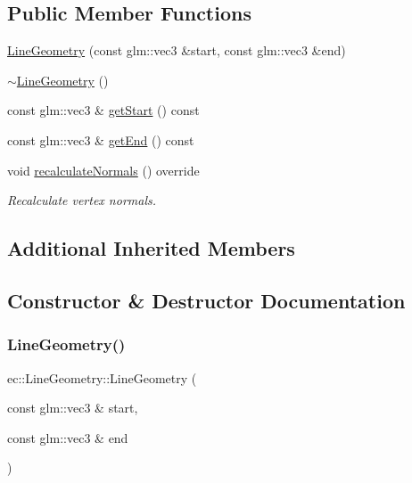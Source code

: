 \subsection*{Public Member Functions}
\begin{DoxyCompactItemize}
\item 
\mbox{\hyperlink{classec_1_1_line_geometry_a4b81b2c570058683d7af913882ed3dfb}{Line\+Geometry}} (const glm\+::vec3 \&start, const glm\+::vec3 \&end)
\item 
\mbox{\hyperlink{classec_1_1_line_geometry_af91430db7913243304adba2dd398e5b4}{$\sim$\+Line\+Geometry}} ()
\item 
const glm\+::vec3 \& \mbox{\hyperlink{classec_1_1_line_geometry_a68975a8bddebc31db08839ec6064a864}{get\+Start}} () const
\item 
const glm\+::vec3 \& \mbox{\hyperlink{classec_1_1_line_geometry_a3f4616c581e43529651008c594c4c8f7}{get\+End}} () const
\item 
void \mbox{\hyperlink{classec_1_1_line_geometry_a7a0b22930aa566c97d5f86f2a8246696}{recalculate\+Normals}} () override
\begin{DoxyCompactList}\small\item\em Recalculate vertex normals. \end{DoxyCompactList}\end{DoxyCompactItemize}
\subsection*{Additional Inherited Members}


\subsection{Constructor \& Destructor Documentation}
\mbox{\label{classec_1_1_line_geometry_a4b81b2c570058683d7af913882ed3dfb}} 
\subsubsection{\texorpdfstring{Line\+Geometry()}{LineGeometry()}}
{\footnotesize\ttfamily ec\+::\+Line\+Geometry\+::\+Line\+Geometry (\begin{DoxyParamCaption}\item[{const glm\+::vec3 \&}]{start,  }\item[{const glm\+::vec3 \&}]{end }\end{DoxyParamCaption})\hspace{0.3cm}{\ttfamily [explicit]}}

